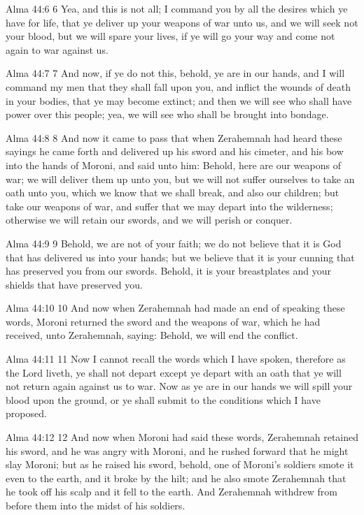 Alma 44:6
 6 Yea, and this is not all; I command you by all the desires
which ye have for life, that ye deliver up your weapons of war
unto us, and we will seek not your blood, but we will spare your
lives, if ye will go your way and come not again to war against
us.

Alma 44:7
 7 And now, if ye do not this, behold, ye are in our hands, and I
will command my men that they shall fall upon you, and inflict
the wounds of death in your bodies, that ye may become extinct;
and then we will see who shall have power over this people; yea,
we will see who shall be brought into bondage.

Alma 44:8
 8 And now it came to pass that when Zerahemnah had heard these
sayings he came forth and delivered up his sword and his cimeter,
and his bow into the hands of Moroni, and said unto him: Behold,
here are our weapons of war; we will deliver them up unto you,
but we will not suffer ourselves to take an oath unto you, which
we know that we shall break, and also our children; but take our
weapons of war, and suffer that we may depart into the
wilderness; otherwise we will retain our swords, and we will
perish or conquer.

Alma 44:9
 9 Behold, we are not of your faith; we do not believe that it is
God that has delivered us into your hands; but we believe that it
is your cunning that has preserved you from our swords. Behold,
it is your breastplates and your shields that have preserved you.

Alma 44:10
 10 And now when Zerahemnah had made an end of speaking these
words, Moroni returned the sword and the weapons of war, which he
had received, unto Zerahemnah, saying: Behold, we will end the
conflict.

Alma 44:11
 11 Now I cannot recall the words which I have spoken, therefore
as the Lord liveth, ye shall not depart except ye depart with an
oath that ye will not return again against us to war. Now as ye
are in our hands we will spill your blood upon the ground, or ye
shall submit to the conditions which I have proposed.

Alma 44:12
 12 And now when Moroni had said these words, Zerahemnah retained
his sword, and he was angry with Moroni, and he rushed forward
that he might slay Moroni; but as he raised his sword, behold,
one of Moroni's soldiers smote it even to the earth, and it broke
by the hilt; and he also smote Zerahemnah that he took off his
scalp and it fell to the earth. And Zerahemnah withdrew from
before them into the midst of his soldiers.

